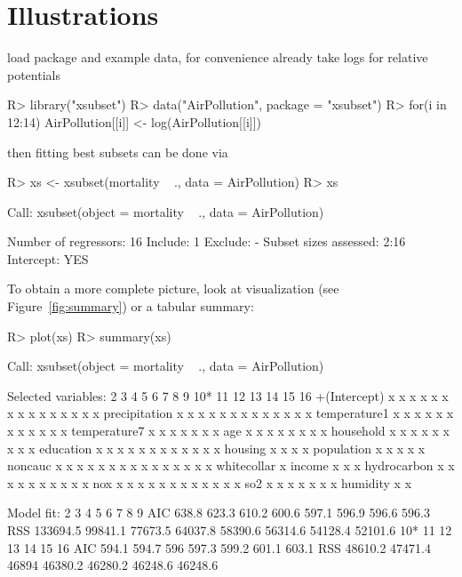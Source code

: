 \documentclass[nojss]{jss}
\begin{document}
\section{Illustrations} \label{sec:illustrations}

load package and example data, for convenience already take logs for relative potentials
%
\begin{Schunk}
\begin{Sinput}
R> library("xsubset")
R> data("AirPollution", package = "xsubset")
R> for(i in 12:14) AirPollution[[i]] <- log(AirPollution[[i]])
\end{Sinput}
\end{Schunk}
%
then fitting best subsets can be done via
%
\begin{Schunk}
\begin{Sinput}
R> xs <- xsubset(mortality ~ ., data = AirPollution)
R> xs
\end{Sinput}
\begin{Soutput}
Call:
xsubset(object = mortality ~ ., data = AirPollution)
                           
Number of regressors:  16  
Include:               1   
Exclude:               -   
Subset sizes assessed: 2:16
Intercept:             YES 
\end{Soutput}
\end{Schunk}
%
To obtain a more complete picture, look at visualization (see
Figure~\ref{fig:summary}) or a tabular summary:
%
\begin{Schunk}
\begin{Sinput}
R> plot(xs)
R> summary(xs)
\end{Sinput}
\begin{Soutput}
Call:
xsubset(object = mortality ~ ., data = AirPollution)

Selected variables:
              2 3 4 5 6 7 8 9 10* 11 12 13 14 15 16
+(Intercept)  x x x x x x x x x   x  x  x  x  x  x 
precipitation     x x x x x x x   x  x  x  x  x  x 
temperature1        x x x x x x   x  x  x  x  x  x 
temperature7                  x   x  x  x  x  x  x 
age                         x x   x  x  x  x  x  x 
household                 x x x   x  x  x  x  x  x 
education       x     x x x x x   x  x  x  x  x  x 
housing                                 x  x  x  x 
population                           x  x  x  x  x 
noncauc       x x x x x x x x x   x  x  x  x  x  x 
whitecollar                                      x 
income                                     x  x  x 
hydrocarbon             x x x x   x  x  x  x  x  x 
nox                 x x x x x x   x  x  x  x  x  x 
so2               x               x  x  x  x  x  x 
humidity                                      x  x 

Model fit:
           2       3       4       5       6       7       8       9
AIC    638.8   623.3   610.2   600.6   597.1   596.9   596.6   596.3
RSS 133694.5 99841.1 77673.5 64037.8 58390.6 56314.6 54128.4 52101.6
        10*      11    12      13      14      15      16
AIC   594.1   594.7   596   597.3   599.2   601.1   603.1
RSS 48610.2 47471.4 46894 46380.2 46280.2 46248.6 46248.6
\end{Soutput}
\end{Schunk}
\end{document}
